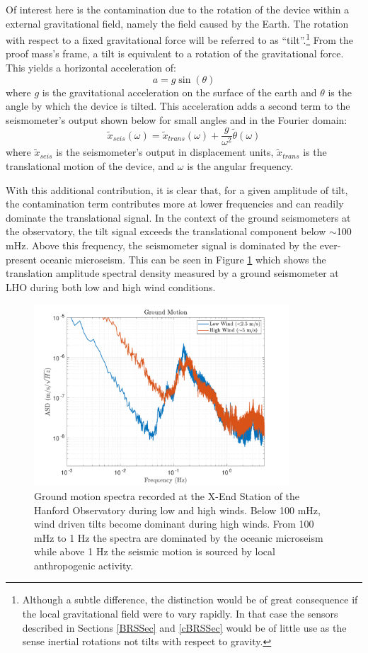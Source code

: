 \documentclass [12pt, proquest]{uwthesis}[2019]
\begin{document}
Of interest here is the contamination due to the rotation of the device within a external gravitational field, namely the field caused by the Earth. The rotation with respect to a fixed gravitational force will be referred to as ``tilt''.\footnote{Although a subtle difference, the distinction would be of great consequence if the local gravitational field were to vary rapidly. In that case the sensors described in Sections \ref{BRSSec} and \ref{cBRSSec} would be of little use as the sense inertial rotations not tilts with respect to gravity.} From the proof mass's frame, a tilt is equivalent to a rotation of the gravitational force. This yields a horizontal acceleration of:
\[ a=g \sin(\theta)\]
where $g$ is the gravitational acceleration on the surface of the earth and $\theta$ is the angle by which the device is tilted. This acceleration adds a second term to the seismometer's output shown below for small angles and in the Fourier domain:
\[\tilde{x}_{seis}(\omega)=\tilde{x}_{trans}(\omega)+\frac{g}{\omega^2}\tilde{\theta}(\omega)\]
where $\tilde{x}_{seis}$ is the seismometer's output in displacement units, $\tilde{x}_{trans}$ is the translational motion of the device, and $\omega$ is the angular frequency. 

With this additional contribution, it is clear that, for a given amplitude of tilt, the contamination term contributes more at lower frequencies and can readily dominate the translational signal. In the context of the ground seismometers at the observatory, the tilt signal exceeds the translational component below $\sim$100 mHz. Above this frequency, the seismometer signal is dominated by the ever-present oceanic microseism. This can be seen in Figure \ref{wind} which shows the translation amplitude spectral density measured by a ground seismometer at LHO during both low and high wind conditions.

\begin{figure}[!h]
\begin{center}
\includegraphics[width=0.85\textwidth]{windComp2.pdf}
\caption[Ground motion spectra during low and high winds]{Ground motion spectra recorded at the X-End Station of the Hanford Observatory during low and high winds. Below 100 mHz, wind driven tilts become dominant during high winds. From 100 mHz to 1 Hz the spectra are dominated by the oceanic microseism while above 1 Hz the seismic motion is sourced by local anthropogenic activity.}
\label{wind}
\end{center}
\end{figure}
\end{document}
